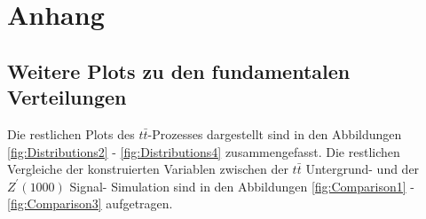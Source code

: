 \section{Anhang}
\label{sec:Anhang}

\subsection{Weitere Plots zu den fundamentalen Verteilungen}
\label{sec:reste}

Die restlichen Plots des $t\bar{t}$-Prozesses dargestellt sind in den Abbildungen \ref{fig:Distributions2} - \ref{fig:Distributions4} zusammengefasst.
Die restlichen Vergleiche der konstruierten Variablen zwischen der $t\bar{t}$ Untergrund- und der $Z^\prime(1000)$ Signal- Simulation sind in den Abbildungen \ref{fig:Comparison1} - \ref{fig:Comparison3} aufgetragen.


